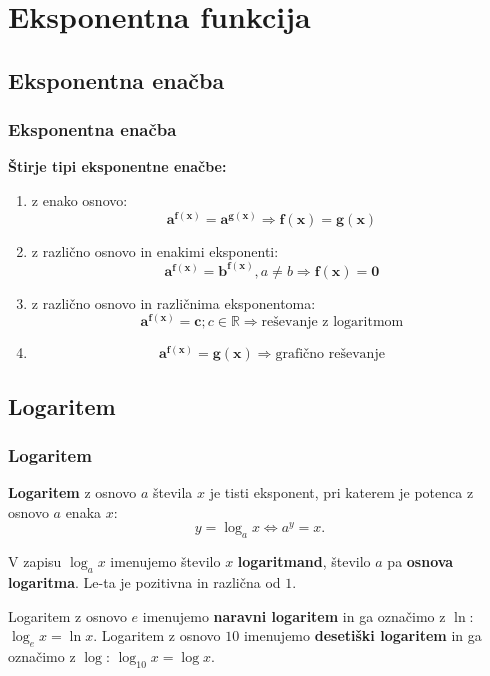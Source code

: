 \section{Eksponentna funkcija}

\begin{frame}
    \sectionpage
\end{frame}

\begin{frame}
\end{frame}

    \subsection{Eksponentna enačba}

        \begin{frame}
            \frametitle{Eksponentna enačba}

            \textbf{Štirje tipi eksponentne enačbe:}
            \begin{enumerate}
                \item z enako osnovo: $$\mathbf{a^{f(x)}=a^{g(x)}} \Rightarrow \mathbf{f(x)=g(x)}$$
                \item z različno osnovo in enakimi eksponenti:  $$\mathbf{a^{f(x)}=b^{f(x)}}, a\neq b \Rightarrow \mathbf{f(x)=0}$$
                \item z različno osnovo in različnima eksponentoma: $$\mathbf{a^{f(x)}=c}; c\in\mathbb{R} \Rightarrow \textrm{reševanje z logaritmom}$$
                \item $$\mathbf{a^{f(x)}=g(x)} \Rightarrow \textrm{grafično reševanje}$$
            \end{enumerate}

        \end{frame}

    \subsection{Logaritem}

        \begin{frame}
            \frametitle{Logaritem}

            \textbf{Logaritem} z osnovo $a$ števila $x$ je tisti eksponent, pri katerem je potenca z osnovo $a$ enaka $x$: $$y=\log_ax \Leftrightarrow a^y=x.$$

            V zapisu $\log_ax$ imenujemo število $x$ \textbf{logaritmand}, število $a$ pa \textbf{osnova logaritma}. Le-ta je pozitivna in različna od $1$.

            Logaritem z osnovo $e$ imenujemo \textbf{naravni logaritem} in ga označimo z $\ln$: $\log_ex=\ln x$.
            Logaritem z osnovo $10$ imenujemo \textbf{desetiški logaritem} in ga označimo z $\log$: $\log_{10}x=\log x$.

        \end{frame}

